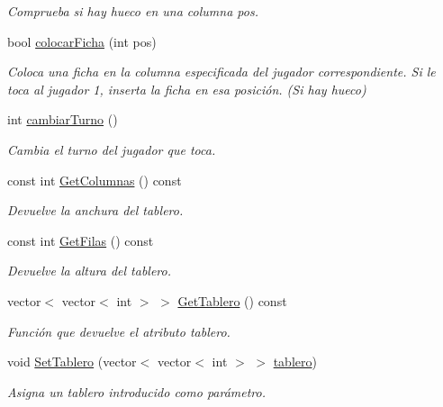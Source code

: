 \begin{DoxyCompactItemize}
\begin{DoxyCompactList}\small\item\em Comprueba si hay hueco en una columna \textquotesingle{}pos\textquotesingle{}. \end{DoxyCompactList}\item 
bool \hyperlink{classTablero_a24bbcc0cf0a9e464f37a261cd9c6ff45}{colocar\+Ficha} (int pos)
\begin{DoxyCompactList}\small\item\em Coloca una ficha en la columna especificada del jugador correspondiente. Si le toca al jugador 1, inserta la ficha en esa posición. (Si hay hueco) \end{DoxyCompactList}\item 
int \hyperlink{classTablero_a6a07659599bca3442cce101d7bf42b9a}{cambiar\+Turno} ()
\begin{DoxyCompactList}\small\item\em Cambia el turno del jugador que toca. \end{DoxyCompactList}\item 
const int \hyperlink{classTablero_a509b0fc105dce485aefcdbd81dc452f5}{Get\+Columnas} () const
\begin{DoxyCompactList}\small\item\em Devuelve la anchura del tablero. \end{DoxyCompactList}\item 
const int \hyperlink{classTablero_a7d0c4ed88f099aaabad1362883b52ef1}{Get\+Filas} () const
\begin{DoxyCompactList}\small\item\em Devuelve la altura del tablero. \end{DoxyCompactList}\item 
vector$<$ vector$<$ int $>$ $>$ \hyperlink{classTablero_aa898aa59dd1d99df69b9f97ce51f33db}{Get\+Tablero} () const
\begin{DoxyCompactList}\small\item\em Función que devuelve el atributo tablero. \end{DoxyCompactList}\item 
void \hyperlink{classTablero_a811481680b64300b21fb4d1e9619e795}{Set\+Tablero} (vector$<$ vector$<$ int $>$ $>$ \hyperlink{classTablero_a5df607d108c0c0a14aa4f393b7f43030}{tablero})
\begin{DoxyCompactList}\small\item\em Asigna un tablero introducido como parámetro. \end{DoxyCompactList}\item 

\end{DoxyCompactItemize}
